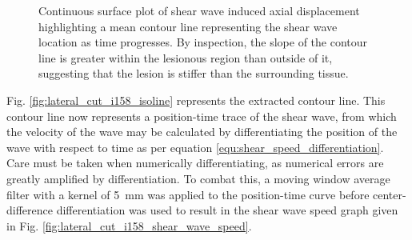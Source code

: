 			\begin{figure}[!htb]
				\centering
				\caption[Sample continuous surface plot of shear wave induced axial displacement highlighting the shear wave location in time]{Continuous surface plot of shear wave induced axial displacement highlighting a mean contour line representing the shear wave location as time progresses. By inspection, the slope of the contour line is greater within the lesionous region than outside of it, suggesting that the lesion is stiffer than the surrounding tissue.}
				\label{fig:lateral_cut_i158_imgsc_isoline}
			\end{figure}

			Fig. \ref{fig:lateral_cut_i158_isoline} represents the extracted contour line. This contour line now represents a position-time trace of the shear wave, from which the velocity of the wave may be calculated by differentiating the position of the wave with respect to time as per equation \ref{equ:shear_speed_differentiation}. Care must be taken when numerically differentiating, as numerical errors are greatly amplified by differentiation. To combat this, a moving window average filter with a kernel of \SI{5}{\mm} was applied to the position-time curve before center-difference differentiation was used to result in the shear wave speed graph given in Fig. \ref{fig:lateral_cut_i158_shear_wave_speed}.

